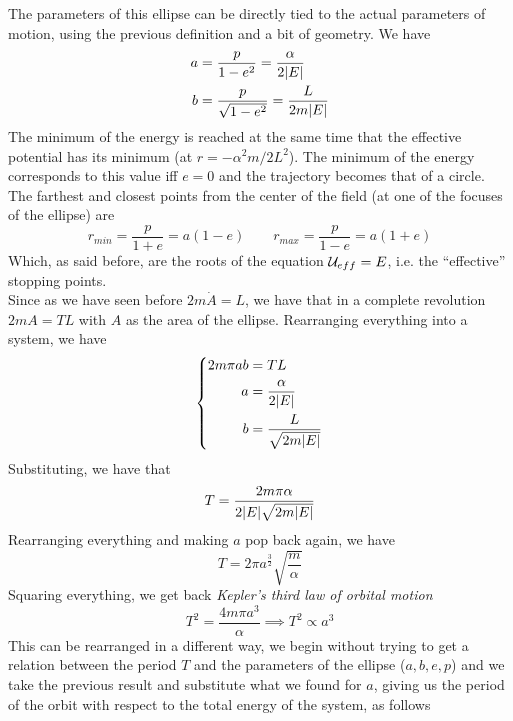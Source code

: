 \documentclass[../admech.tex]{subfiles}
\begin{document}
The parameters of this ellipse can be directly tied to the actual parameters of motion, using the previous definition and a bit of geometry. We have
\begin{equation}
	\begin{aligned}
		a&=\frac{p}{1-e^2}=\frac{\alpha}{2\abs{E}}\\
		b&=\frac{p}{\sqrt{1-e^2}}=\frac{L}{2m\abs{E}}
	\end{aligned}
	\label{eq:parametersellipseorbit}
\end{equation}
The minimum of the energy is reached at the same time that the effective potential has its minimum (at $r=-\alpha^2m/2L^2$). The minimum of the energy corresponds to this value iff $e=0$ and the trajectory becomes that of a circle. The farthest and closest points from the center of the field (at one of the focuses of the ellipse) are
\begin{equation}
	r_{min}=\frac{p}{1+e}=a(1-e)\qquad r_{max}=\frac{p}{1-e}=a(1+e)
	\label{eq:minmaxorbit}
\end{equation}
Which, as said before, are the roots of the equation $\mathcal{U}_{eff}=E$, i.e. the ``effective'' stopping points.\\
Since as we have seen before $2m\dot{A}=L$, we have that in a complete revolution $2mA=TL$ with $A$ as the area of the ellipse. Rearranging everything into a system, we have
\begin{equation}
	\left\{ \begin{aligned}
		2m\pi ab&=TL\\
		a&=\frac{\alpha}{2\abs{E}}\\
		b&=\frac{L}{\sqrt{2m\abs{E}}}
	\end{aligned}\right.
	\label{eq:systemkepler3}
\end{equation}
Substituting, we have that
\begin{equation*}
	T=\frac{2m\pi\alpha}{2\abs{E}\sqrt{2m\abs{E}}}
\end{equation*}
Rearranging everything and making $a$ pop back again, we have
\begin{equation}
	T=2\pi a^{\frac{3}{2}}\sqrt{\frac{m}{\alpha}}
	\label{eq:kepler31/2}
\end{equation}
Squaring everything, we get back \emph{Kepler's third law of orbital motion}
\begin{equation}
	T^2=\frac{4m\pi a^3}{\alpha}\implies T^2\propto a^3
	\label{eq:kepler3complete}
\end{equation}
This can be rearranged in a different way, we begin without trying to get a relation between the period $T$ and the parameters of the ellipse ($a,b,e,p$) and we take the previous result and substitute what we found for $a$, giving us the period of the orbit with respect to the total energy of the system, as follows
\end{document}
